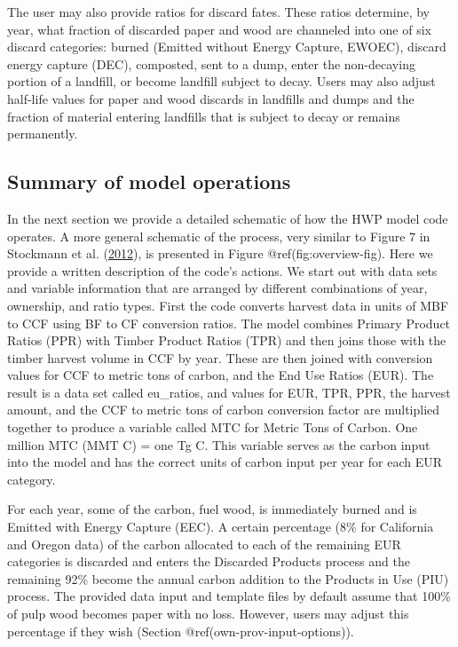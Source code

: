 \documentclass[
  openany]{book}
\begin{document}
The user may also provide ratios for discard fates. These ratios
determine, by year, what fraction of discarded paper and wood are
channeled into one of six discard categories: burned (Emitted without
Energy Capture, EWOEC), discard energy capture (DEC), composted, sent to
a dump, enter the non-decaying portion of a landfill, or become landfill
subject to decay. Users may also adjust half-life values for paper and
wood discards in landfills and dumps and the fraction of material
entering landfills that is subject to decay or remains permanently.

\hypertarget{model-func-opp}{%
\subsection{Summary of model operations}\label{model-func-opp}}

In the next section we provide a detailed schematic of how the HWP model
code operates. A more general schematic of the process, very similar to
Figure 7 in Stockmann et al.
(\protect\hyperlink{ref-stockmann2012}{2012}), is presented in Figure
@ref(fig:overview-fig). Here we provide a written description of the
code's actions. We start out with data sets and variable information
that are arranged by different combinations of year, ownership, and
ratio types. First the code converts harvest data in units of MBF to CCF
using BF to CF conversion ratios. The model combines Primary Product
Ratios (PPR) with Timber Product Ratios (TPR) and then joins those with
the timber harvest volume in CCF by year. These are then joined with
conversion values for CCF to metric tons of carbon, and the End Use
Ratios (EUR). The result is a data set called eu\_ratios, and values for
EUR, TPR, PPR, the harvest amount, and the CCF to metric tons of carbon
conversion factor are multiplied together to produce a variable called
MTC for Metric Tons of Carbon. One million MTC (MMT C) = one Tg C. This
variable serves as the carbon input into the model and has the correct
units of carbon input per year for each EUR category.

For each year, some of the carbon, fuel wood, is immediately burned and
is Emitted with Energy Capture (EEC). A certain percentage (8\% for
California and Oregon data) of the carbon allocated to each of the
remaining EUR categories is discarded and enters the Discarded Products
process and the remaining 92\% become the annual carbon addition to the
Products in Use (PIU) process. The provided data input and template
files by default assume that 100\% of pulp wood becomes paper with no
loss. However, users may adjust this percentage if they wish (Section
@ref(own-prov-input-options)).
\end{document}
